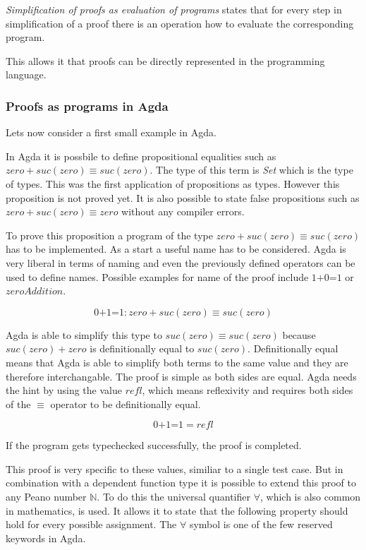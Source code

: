 \emph{Simplification of proofs as evaluation of programs} states that for every step in simplification of a proof there is an operation how to evaluate the corresponding program.

This allows it that proofs can be directly represented in the programming language.

\subsubsection{Proofs as programs in Agda}
Lets now consider a first small example in Agda.

In Agda it is possbile to define propositional equalities such as $zero + suc(zero) \equiv suc(zero)$. The type of this term is \emph{Set} which is the type of types.
This was the first application of propositions as types.
However this proposition is not proved yet. It is also possible to state false propositions such as $zero + suc(zero) \equiv zero$ without any compiler errors.

To prove this proposition a program of the type $zero + suc(zero) \equiv suc(zero)$ has to be implemented.
As a start a useful name has to be considered. Agda is very liberal in terms of naming and even the previously defined operators can be used to define names. Possible examples for name of the proof include $\text{1+0=1}$ or $zeroAddition$.

$$\text{0+1=1} : zero + suc(zero) \equiv suc(zero)$$

Agda is able to simplify this type to $suc(zero) \equiv suc(zero)$ because $suc(zero) + zero$ is definitionally equal to $suc(zero)$. Definitionally equal means that Agda is able to simplify both terms to the same value and they are therefore interchangable.
The proof is simple as both sides are equal. 
Agda needs the hint by using the value $refl$, which means reflexivity and requires both sides of the $\equiv$ operator to be definitionally equal.

$$\text{0+1=1} = refl$$

If the program gets typechecked successfully, the proof is completed.

This proof is very specific to these values, similiar to a single test case.
But in combination with a dependent function type it is possible to extend this proof to any Peano number $\mathbb{N}$. 
To do this the universal quantifier $\forall$, which is also common in mathematics, is used.
It allows it to state that the following property should hold for every possible assignment\cite{plfa2019}.
The $\forall$ symbol is one of the few reserved keywords in Agda.

